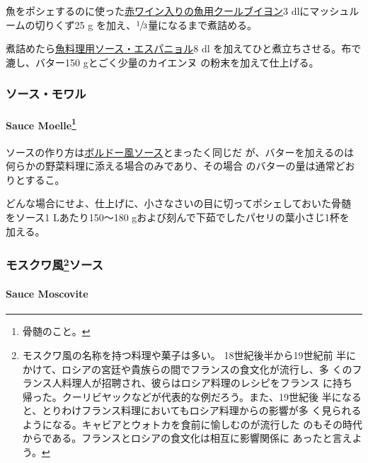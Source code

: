 
魚をポシェするのに使った\href{}{赤ワイン入りの魚用クールブイヨン}3
dlにマッシュルームの切りくず25 g
を加え、\(\sfrac{1}{3}\)量になるまで煮詰める。

煮詰めたら\protect\hyperlink{sauce-espagnole-maigre}{魚料理用ソース・エスパニョル}8
dl を加えてひと煮立ちさせる。布で漉し、バター150 gとごく少量のカイエンヌ
の粉末を加えて仕上げる。

\maeaki

\hypertarget{ux30bdux30fcux30b9ux30e2ux30efux30eb}{%
\subsubsection{ソース・モワル}\label{ux30bdux30fcux30b9ux30e2ux30efux30eb}}

\hypertarget{sauce-moelle}{%
\paragraph[Sauce Moelle]{\texorpdfstring{Sauce Moelle\footnote{骨髄のこと。}}{Sauce Moelle}}\label{sauce-moelle}}


ソースの作り方は\protect\hyperlink{sauce-bordelaise}{ボルドー風ソース}とまったく同じだ
が、バターを加えるのは何らかの野菜料理に添える場合のみであり、その場合
のバターの量は通常どおりとするこ。

どんな場合にせよ、仕上げに、小さなさいの目に切ってポシェしておいた骨髄
をソース1 Lあたり150〜180 gおよび刻んで下茹でしたパセリの葉小さじ1杯を
加える。

\maeaki

\hypertarget{ux30e2ux30b9ux30afux30efux98a856ux30bdux30fcux30b9}{%
\subsubsection[モスクワ風ソース]{\texorpdfstring{モスクワ風\footnote{モスクワ風の名称を持つ料理や菓子は多い。
  18世紀後半から19世紀前
  半にかけて、ロシアの宮廷や貴族らの間でフランスの食文化が流行し、多
  くのフランス人料理人が招聘され、彼らはロシア料理のレシピをフランス
  に持ち帰った。クーリビヤックなどが代表的な例だろう。また、19世紀後
  半になると、とりわけフランス料理においてもロシア料理からの影響が多
  く見られるようになる。キャビアとウォトカを食前に愉しむのが流行した
  のもその時代からである。フランスとロシアの食文化は相互に影響関係に
  あったと言えよう。}ソース}{モスクワ風ソース}}\label{ux30e2ux30b9ux30afux30efux98a856ux30bdux30fcux30b9}}

\hypertarget{sauce-moscovite}{%
\paragraph{Sauce Moscovite}\label{sauce-moscovite}}

